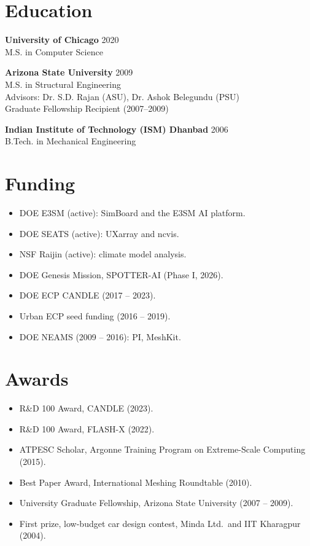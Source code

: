 \documentclass[10pt,letterpaper]{article}
\begin{document}
\section{Education}
\textbf{University of Chicago} \hfill 2020 \\
M.S. in Computer Science

\vspace{4pt}
\textbf{Arizona State University} \hfill 2009 \\
M.S. in Structural Engineering \\
Advisors: Dr. S.D. Rajan (ASU), Dr. Ashok Belegundu (PSU) \\
Graduate Fellowship Recipient (2007--2009)

\vspace{4pt}
\textbf{Indian Institute of Technology (ISM) Dhanbad} \hfill 2006 \\
B.Tech. in Mechanical Engineering

\section{Funding}
\begin{itemize}
  \item DOE E3SM (active): SimBoard and the E3SM AI platform.
  \item DOE SEATS (active): UXarray and ncvis.
  \item NSF Raijin (active): climate model analysis.
  \item DOE Genesis Mission, SPOTTER-AI (Phase I, 2026).
  \item DOE ECP CANDLE (2017 -- 2023).
  \item Urban ECP seed funding (2016 -- 2019).
  \item DOE NEAMS (2009 -- 2016): PI, MeshKit.
\end{itemize}

\section{Awards}
\begin{itemize}
  \item R\&D 100 Award, CANDLE (2023).
  \item R\&D 100 Award, FLASH-X (2022).
  \item ATPESC Scholar, Argonne Training Program on Extreme-Scale Computing (2015).
  \item Best Paper Award, International Meshing Roundtable (2010).
  \item University Graduate Fellowship, Arizona State University (2007 -- 2009).
  \item First prize, low-budget car design contest, Minda Ltd.\ and IIT Kharagpur (2004).
\end{itemize}
\end{document}
